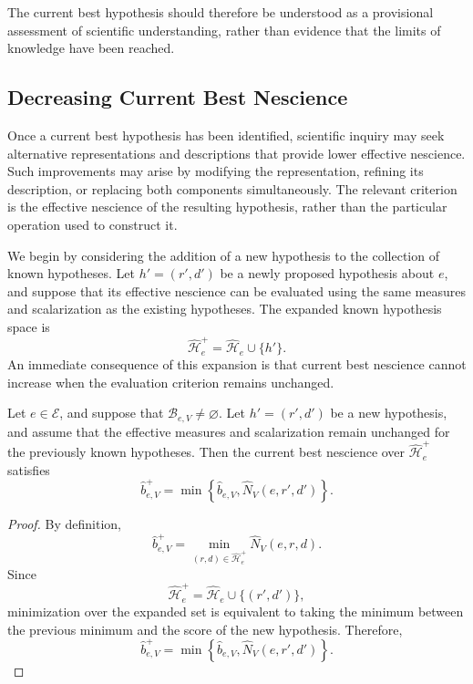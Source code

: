 The current best hypothesis should therefore be understood as a provisional assessment of scientific understanding, rather than evidence that the limits of knowledge have been reached.

\subsection*{Decreasing Current Best Nescience}

Once a current best hypothesis has been identified, scientific inquiry may seek alternative representations and descriptions that provide lower effective nescience. Such improvements may arise by modifying the representation, refining its description, or replacing both components simultaneously. The relevant criterion is the effective nescience of the resulting hypothesis, rather than the particular operation used to construct it.

We begin by considering the addition of a new hypothesis to the collection of known hypotheses. Let $h'=(r',d')$ be a newly proposed hypothesis about $e$, and suppose that its effective nescience can be evaluated using the same measures and scalarization as the existing hypotheses. The expanded known hypothesis space is
\[
\widehat{\mathcal H}_e^{+} = \widehat{\mathcal H}_e\cup\{h'\}.
\]
An immediate consequence of this expansion is that current best nescience cannot increase when the evaluation criterion remains unchanged.

\begin{proposition}
\label{prop:current_best_expansion}
Let $e\in\mathcal E$, and suppose that $\mathcal B_{e,V}\neq\varnothing$. Let $h'=(r',d')$ be a new hypothesis, and assume that the effective measures and scalarization remain unchanged for the previously known hypotheses. Then the current best nescience over $\widehat{\mathcal H}_e^{+}$ satisfies
\[
\widehat b_{e,V}^{+} = \min\left\{ \widehat b_{e,V}, \widehat N_V(e,r',d') \right\}.
\]
\end{proposition}
\begin{proof}
By definition,
\[
\widehat b_{e,V}^{+} = \min_{(r,d)\in\widehat{\mathcal H}_e^{+}} \widehat N_V(e,r,d).
\]
Since
\[
\widehat{\mathcal H}_e^{+} = \widehat{\mathcal H}_e\cup\{(r',d')\},
\]
minimization over the expanded set is equivalent to taking the minimum between the previous minimum and the score of the new hypothesis. Therefore,
\[
\widehat b_{e,V}^{+} = \min\left\{ \widehat b_{e,V}, \widehat N_V(e,r',d') \right\}.
\]
\end{proof}

